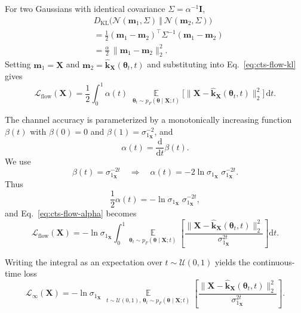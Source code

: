 For two Gaussians with identical covariance $\Sigma = \alpha^{-1}\mathbf{I}$,
\begin{equation}
\begin{aligned}
& D_{\mathrm{KL}}\big(
\mathcal{N}(\mathbf{m}_1,\Sigma)\ \Vert\ \mathcal{N}(\mathbf{m}_2,\Sigma)
\big)\\
& =
\frac{1}{2}(\mathbf{m}_1-\mathbf{m}_2)^\top \Sigma^{-1} (\mathbf{m}_1-\mathbf{m}_2) \\
& =
\frac{\alpha}{2}\,\|\mathbf{m}_1-\mathbf{m}_2\|_2^2.
\end{aligned}
\end{equation}
Setting $\mathbf{m}_1=\mathbf{X}$ and $\mathbf{m}_2=\hat{\mathbf{k}}_{\mathbf{X}}(\boldsymbol{\theta}_t,t)$
and substituting into Eq.~\eqref{eq:cts-flow-kl} gives
\begin{equation}
\mathcal{L}_{\text{flow}}(\mathbf{X})
=
\frac{1}{2}
\int_0^1
\alpha(t)\;
\mathop{\mathbb{E}}\limits_{\boldsymbol{\theta}_t \sim p_F(\boldsymbol{\theta}\mid \mathbf{X};t)}
\big[
\|\mathbf{X}-\hat{\mathbf{k}}_{\mathbf{X}}(\boldsymbol{\theta}_t,t)\|_2^2
\big]\,\mathrm{d}t.
\label{eq:cts-flow-alpha}
\end{equation}

The channel accuracy is parameterized by a monotonically increasing function $\beta(t)$ with
$\beta(0)=0$ and $\beta(1)=\sigma_{1_\mathbf{X}}^{-2}$, and
\begin{equation}
\alpha(t) = \frac{\mathrm{d}}{\mathrm{d}t}\beta(t).
\end{equation}
We use
\begin{equation}
\beta(t) = \sigma_{1_\mathbf{X}}^{-2t}
\quad\Rightarrow\quad
\alpha(t)
=
- 2 \ln \sigma_{1_\mathbf{X}} \;\sigma_{1_\mathbf{X}}^{-2t}.
\end{equation}
Thus
\begin{equation}
\frac{1}{2}\alpha(t)
=
- \ln \sigma_{1_\mathbf{X}} \;\sigma_{1_\mathbf{X}}^{-2t},
\end{equation}
and Eq.~\eqref{eq:cts-flow-alpha} becomes
\begin{equation}
\mathcal{L}_{\text{flow}}(\mathbf{X}) = 
- \ln \sigma_{1_\mathbf{X}}
\int_0^1
\mathop{\mathbb{E}}\limits_{\boldsymbol{\theta}_t \sim p_F(\boldsymbol{\theta}\mid \mathbf{X};t)}
\left[
    \frac{\big\| \mathbf{X} - \hat{\mathbf{k}}_{\mathbf{X}}(\boldsymbol{\theta}_t,t) \big\|_2^2}
         {\sigma_{1_\mathbf{X}}^{2t}}
\right]\mathrm{d}t.
\end{equation}



Writing the integral as an expectation over $t \sim \mathcal{U}(0,1)$ yields the continuous-time loss
\begin{equation}
\mathcal{L}_{\infty}(\mathbf{X}) = 
- \ln \sigma_{1_\mathbf{X}}\;
\mathop{\mathbb{E}}\limits_{t\sim\mathcal{U}(0,1),\,
           \boldsymbol{\theta}_t \sim p_F(\boldsymbol{\theta}\mid \mathbf{X};t)}
\left[
\frac{\|\mathbf{X}-\hat{\mathbf{k}}_{\mathbf{X}}(\boldsymbol{\theta}_t,t)\|_2^2}
     {\sigma_{1_\mathbf{X}}^{2t}}
\right].
\end{equation}

